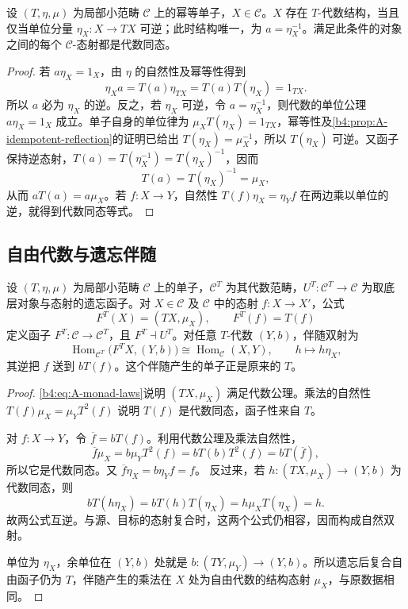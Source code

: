 \begin{proposition}\label{b4:prop:A-idempotent-algebras}
	设 \((T,\eta,\mu)\) 为局部小范畴 \(\mathcal C\) 上的幂等单子，\(X\in\mathcal C\)。\(X\) 存在 \(T\)-代数结构，当且仅当单位分量 \(\eta_X:X\to TX\) 可逆；此时结构唯一，为 \(a=\eta_X^{-1}\)。满足此条件的对象之间的每个 \(\mathcal C\)-态射都是代数同态。
\end{proposition}
\begin{proof}
	若 \(a\eta_X=1_X\)，由 \(\eta\) 的自然性及幂等性得到
	\[
		\eta_Xa=T(a)\eta_{TX}=T(a)T(\eta_X)=1_{TX}.
	\]
	所以 \(a\) 必为 \(\eta_X\) 的逆。反之，若 \(\eta_X\) 可逆，令 \(a=\eta_X^{-1}\)，则代数的单位公理 \(a\eta_X=1_X\) 成立。单子自身的单位律为 \(\mu_XT(\eta_X)=1_{TX}\)，幂等性及\cref{b4:prop:A-idempotent-reflection}的证明已给出 \(T(\eta_X)=\mu_X^{-1}\)，所以 \(T(\eta_X)\) 可逆。又函子保持逆态射，\(T(a)=T(\eta_X^{-1})=T(\eta_X)^{-1}\)，因而
	\[
		T(a)=T(\eta_X)^{-1}=\mu_X,
	\]
	从而 \(aT(a)=a\mu_X\)。若 \(f:X\to Y\)，自然性 \(T(f)\eta_X=\eta_Yf\) 在两边乘以单位的逆，就得到代数同态等式。
\end{proof}

\subsection{自由代数与遗忘伴随}
\label{b4:subsec:A02:02}

\begin{theorem}[自由代数与遗忘伴随]\label{b4:thm:A-em-adjunction}
	设 \((T,\eta,\mu)\) 为局部小范畴 \(\mathcal C\) 上的单子，\(\mathcal C^T\) 为其代数范畴，\(U^T:\mathcal C^T\to\mathcal C\) 为取底层对象与态射的遗忘函子。对 \(X\in\mathcal C\) 及 \(\mathcal C\) 中的态射 \(f:X\to X'\)，公式
	\[
		F^T(X)=(TX,\mu_X),\qquad F^T(f)=T(f)
	\]
	定义函子 \(F^T:\mathcal C\to\mathcal C^T\)，且 \(F^T\dashv U^T\)。对任意 \(T\)-代数 \((Y,b)\)，伴随双射为
	\begin{equation}\label{b4:eq:A-em-adjunction}
		\operatorname{Hom}_{\mathcal C^T}\bigl(F^TX,(Y,b)\bigr) \cong\operatorname{Hom}_{\mathcal C}(X,Y), \qquad h\longmapsto h\eta_X,
	\end{equation}
	其逆把 \(f\) 送到 \(bT(f)\)。这个伴随产生的单子正是原来的 \(T\)。
\end{theorem}
\begin{proof}
	\eqref{b4:eq:A-monad-laws}说明 \((TX,\mu_X)\) 满足代数公理。乘法的自然性 \(T(f)\mu_X=\mu_YT^2(f)\) 说明 \(T(f)\) 是代数同态，函子性来自 \(T\)。

	对 \(f:X\to Y\)，令 \(\overline f=bT(f)\)。利用代数公理及乘法自然性，
	\[
		\overline f\mu_X =b\mu_YT^2(f) =bT(b)T^2(f)=bT(\overline f),
	\]
	所以它是代数同态。又 \(\overline f\eta_X=b\eta_Yf=f\)。 反过来，若 \(h:(TX,\mu_X)\to(Y,b)\) 为代数同态，则
	\[
		bT(h\eta_X)=bT(h)T(\eta_X) =h\mu_XT(\eta_X)=h.
	\]
	故两公式互逆。与源、目标的态射复合时，这两个公式仍相容，因而构成自然双射。

	单位为 \(\eta_X\)，余单位在 \((Y,b)\) 处就是 \(b:(TY,\mu_Y)\to(Y,b)\)。所以遗忘后复合自由函子仍为 \(T\)，伴随产生的乘法在 \(X\) 处为自由代数的结构态射 \(\mu_X\)，与原数据相同。
\end{proof}

